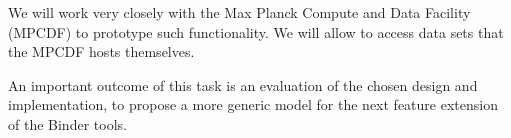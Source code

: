 \begin{task}
  We will work very closely with the Max Planck Compute and Data Facility
  (MPCDF) to prototype such functionality. We will allow to access data sets
  that the MPCDF hosts themselves.

  An important outcome of this task is an evaluation of the chosen design and
  implementation, to propose a more generic model for the next feature extension
  of the Binder tools.
\end{task}

